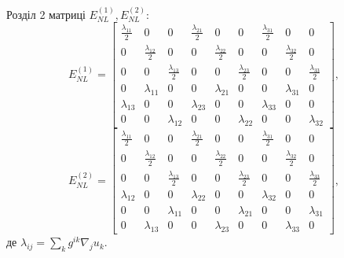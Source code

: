 \documentclass[8pt]{beamer}
\numberwithin{figure}{section}
\numberwithin{equation}{section}
\begin{document}
\begin{frame}{Розділ 2}
матриці $E_{NL}^{(1)}, E_{NL}^{(2)}$:
\begin{equation}
E_{NL}^{(1)}=\left[\begin{matrix}
\frac{\lambda_{11}}{2} & 0 & 0 & \frac{\lambda_{21}}{2} & 0 & 0 & \frac{\lambda_{31}}{2} & 0 & 0\\
0 & \frac{\lambda_{12}}{2} & 0 & 0 & \frac{\lambda_{22}}{2} & 0 & 0 & \frac{\lambda_{32}}{2} & 0\\
0 & 0 & \frac{\lambda_{13}}{2} & 0 & 0 & \frac{\lambda_{23}}{2} & 0 & 0 & \frac{\lambda_{33}}{2}\\
0 & \lambda_{11} & 0 & 0 & \lambda_{21} & 0 & 0 & \lambda_{31} & 0\\
\lambda_{13} & 0 & 0 & \lambda_{23} & 0 & 0 & \lambda_{33} & 0 & 0\\
0 & 0 & \lambda_{12} & 0 & 0 & \lambda_{22} & 0 & 0 & \lambda_{32}
\end{matrix}\right],
\end{equation}
\begin{equation}
E_{NL}^{(2)}=\left[\begin{matrix}
\frac{\lambda_{11}}{2} & 0 & 0 & \frac{\lambda_{21}}{2} & 0 & 0 & \frac{\lambda_{31}}{2} & 0 & 0\\
0 & \frac{\lambda_{12}}{2} & 0 & 0 & \frac{\lambda_{22}}{2} & 0 & 0 & \frac{\lambda_{32}}{2} & 0\\
0 & 0 & \frac{\lambda_{13}}{2} & 0 & 0 & \frac{\lambda_{23}}{2} & 0 & 0 & \frac{\lambda_{33}}{2}\\
\lambda_{12} & 0 & 0 & \lambda_{22} & 0 & 0 & \lambda_{32} & 0 & 0\\
0 & 0 & \lambda_{11} & 0 & 0 & \lambda_{21} & 0 & 0 & \lambda_{31}\\
0 & \lambda_{13} & 0 & 0 & \lambda_{23} & 0 & 0 & \lambda_{33} & 0
\end{matrix}\right],
\end{equation}
де
$ \lambda_{ij}=\sum_k g^{ik}\nabla_j u_k $.

\end{frame}
\end{document}
